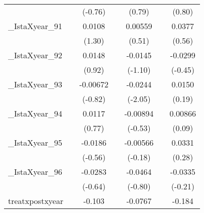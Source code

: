 {\begin{tabular}{l*{6}{c}}
            &                     &     (-0.76)         &                     &      (0.79)         &                     &      (0.80)         \\
[1em]
\_IstaXyear\_91&                     &      0.0108         &                     &     0.00559         &                     &      0.0377         \\
            &                     &      (1.30)         &                     &      (0.51)         &                     &      (0.56)         \\
[1em]
\_IstaXyear\_92&                     &      0.0148         &                     &     -0.0145         &                     &     -0.0299         \\
            &                     &      (0.92)         &                     &     (-1.10)         &                     &     (-0.45)         \\
[1em]
\_IstaXyear\_93&                     &    -0.00672         &                     &     -0.0244\sym{*}  &                     &      0.0150         \\
            &                     &     (-0.82)         &                     &     (-2.05)         &                     &      (0.19)         \\
[1em]
\_IstaXyear\_94&                     &      0.0117         &                     &    -0.00894         &                     &     0.00866         \\
            &                     &      (0.77)         &                     &     (-0.53)         &                     &      (0.09)         \\
[1em]
\_IstaXyear\_95&                     &     -0.0186         &                     &    -0.00566         &                     &      0.0331         \\
            &                     &     (-0.56)         &                     &     (-0.18)         &                     &      (0.28)         \\
[1em]
\_IstaXyear\_96&                     &     -0.0283         &                     &     -0.0464         &                     &     -0.0335         \\
            &                     &     (-0.64)         &                     &     (-0.80)         &                     &     (-0.21)         \\
[1em]
treatxpostxyear&                     &      -0.103\sym{***}&                     &     -0.0767\sym{*}  &                     &      -0.184\sym{***}\\

\end{tabular}}
